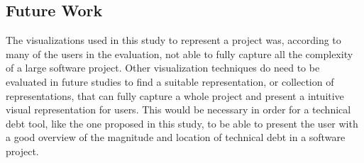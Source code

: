 \subsection{Future Work}
The visualizations used in this study to represent a project was, according to many of the users in the evaluation, not able to fully capture all the complexity of a large software project.
Other visualization techniques do need to be evaluated in future studies to find a suitable representation, or collection of representations, that can fully capture a whole project and present a intuitive visual representation for users.
This would be necessary in order for a technical debt tool, like the one proposed in this study, to be able to present the user with a good overview of the magnitude and location of technical debt in a software project.